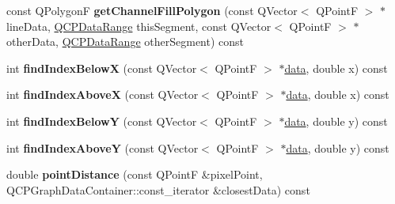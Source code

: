 \begin{DoxyCompactItemize}
\item 
\mbox{\label{classQCPGraph_a9a5bdd5cb695d95d3eea80cfe96c5118}} 
const Q\+PolygonF {\bfseries get\+Channel\+Fill\+Polygon} (const Q\+Vector$<$ Q\+PointF $>$ $\ast$line\+Data, \hyperlink{classQCPDataRange}{Q\+C\+P\+Data\+Range} this\+Segment, const Q\+Vector$<$ Q\+PointF $>$ $\ast$other\+Data, \hyperlink{classQCPDataRange}{Q\+C\+P\+Data\+Range} other\+Segment) const
\item 
\mbox{\label{classQCPGraph_a8c3f15dd5a06633011a6ef36016d308b}} 
int {\bfseries find\+Index\+BelowX} (const Q\+Vector$<$ Q\+PointF $>$ $\ast$\hyperlink{classQCPGraph_a141aa31a1f19bbd0ce60f55eaeb9ea60}{data}, double x) const
\item 
\mbox{\label{classQCPGraph_aaabd6c6a7200a2672c44e62bd2a1cafa}} 
int {\bfseries find\+Index\+AboveX} (const Q\+Vector$<$ Q\+PointF $>$ $\ast$\hyperlink{classQCPGraph_a141aa31a1f19bbd0ce60f55eaeb9ea60}{data}, double x) const
\item 
\mbox{\label{classQCPGraph_a5b0291f248e8ca8eaa82833ab420dcd0}} 
int {\bfseries find\+Index\+BelowY} (const Q\+Vector$<$ Q\+PointF $>$ $\ast$\hyperlink{classQCPGraph_a141aa31a1f19bbd0ce60f55eaeb9ea60}{data}, double y) const
\item 
\mbox{\label{classQCPGraph_a8b952a5f937840dc242489585cc8000d}} 
int {\bfseries find\+Index\+AboveY} (const Q\+Vector$<$ Q\+PointF $>$ $\ast$\hyperlink{classQCPGraph_a141aa31a1f19bbd0ce60f55eaeb9ea60}{data}, double y) const
\item 
\mbox{\label{classQCPGraph_a89acf99c0b52b8eecb2438adf7ec0170}} 
double {\bfseries point\+Distance} (const Q\+PointF \&pixel\+Point, Q\+C\+P\+Graph\+Data\+Container\+::const\+\_\+iterator \&closest\+Data) const
\end{DoxyCompactItemize}
